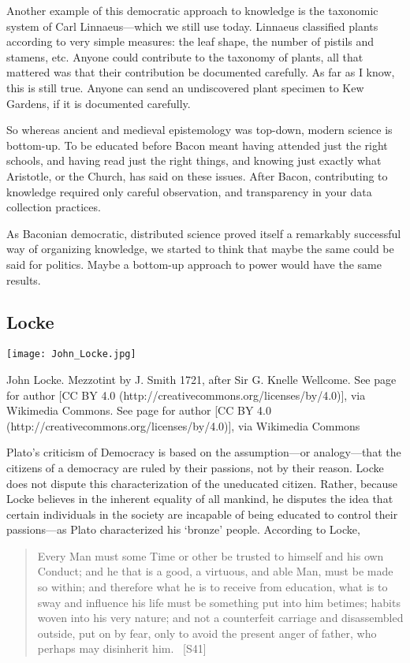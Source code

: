 Another example of this democratic approach to knowledge is the taxonomic system of Carl Linnaeus---which we still use today. Linnaeus classified plants according to very simple measures: the leaf shape, the number of pistils and stamens, etc. Anyone could contribute to the taxonomy of plants, all that mattered was that their contribution be documented carefully. As far as I know, this is still true. Anyone can send an undiscovered plant specimen to Kew Gardens, if it is documented carefully.

So whereas ancient and medieval epistemology was top-down, modern science is bottom-up. To be educated before Bacon meant having attended just the right schools, and having read just the right things, and knowing just exactly what Aristotle, or the Church, has said on these issues. After Bacon, contributing to knowledge required only careful observation, and transparency in your data collection practices.

As Baconian democratic, distributed science proved itself a remarkably successful way of organizing knowledge, we started to think that maybe the same could be said for politics. Maybe a bottom-up approach to power would have the same results. 

\subsection{Locke}
\label{locke}

\begin{marginfigure}\texttt{[image: John\_Locke.jpg]}\caption{John Locke. Mezzotint by J. Smith 1721, after Sir G. Knelle Wellcome. See page for author [CC BY 4.0 (http://creativecommons.org/licenses/by/4.0)], via Wikimedia Commons. See page for author [CC BY 4.0 (http://creativecommons.org/licenses/by/4.0)], via Wikimedia Commons}\label{fig:locke}\end{marginfigure}Plato's criticism of Democracy is based on the assumption---or analogy---that the citizens of a democracy are ruled by their passions, not by their reason. Locke does not dispute this characterization of the uneducated citizen. Rather, because Locke believes in the inherent equality of all mankind, he disputes the idea that certain individuals in the society are incapable of being educated to control their passions---as Plato characterized his `bronze' people. According to Locke, 

\begin{quote}

Every Man must some Time or other be trusted to himself and his own Conduct; and he that is a good, a virtuous, and able Man, must be made so within; and therefore what he is to receive from education, what is to sway and influence his life must be something put into him betimes; habits woven into his very nature; and not a counterfeit carriage and disassembled outside, put on by fear, only to avoid the present anger of father, who perhaps may disinherit him. ~\citep{Locke:1693va}[S41]
\end{quote}

